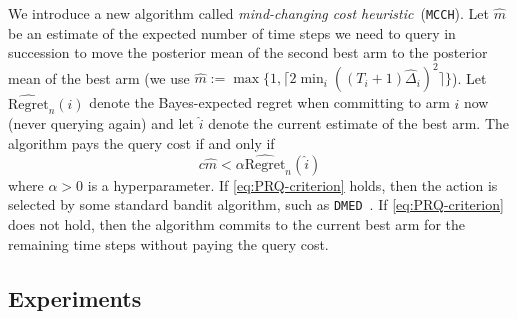 \documentclass{article}
\newcommand{\regretHAT}{\hat{\mathrm{Regret}}}
\begin{document}
We introduce a new algorithm called \emph{mind-changing cost heuristic}~(\texttt{MCCH}).
Let $\hat{m}$ be an estimate of the expected number of time steps
we need to query in succession to move the posterior mean of the second best arm to the posterior mean of the best arm
(we use $\hat{m} := \max\{ 1, \lceil 2\min_i ((T_i + 1) \hat{\Delta}_i)^2 \rceil \}$).
Let $\regretHAT_n(i)$ denote the Bayes-expected regret
when committing to arm $i$ now (never querying again) and
let $\hat{i}$ denote the current estimate of the best arm.
%
The algorithm pays the query cost if and only if
\begin{equation}\label{eq:PRQ-criterion}
c\hat{m} < \alpha \regretHAT_n(\hat{i})
\end{equation}
where $\alpha > 0$ is a hyperparameter.
If \eqref{eq:PRQ-criterion} holds,
then the action is selected by some standard bandit algorithm,
such as \texttt{DMED}~\citep{Honda10}.
If \eqref{eq:PRQ-criterion} does not hold,
then the algorithm commits to the current best arm for the remaining time steps without paying the query cost.



\subsection{Experiments}
\end{document}
